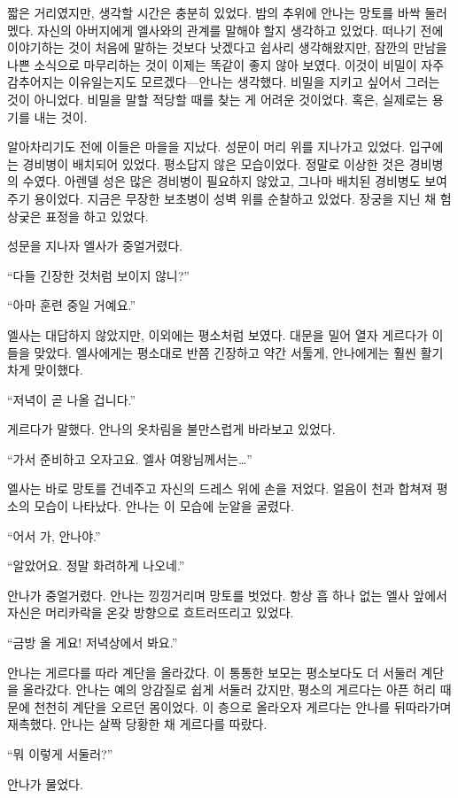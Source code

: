 짧은 거리였지만, 생각할 시간은 충분히 있었다. 밤의 추위에 안나는 망토를 바싹 둘러멨다. 자신의 아버지에게 엘사와의 관계를 말해야 할지 생각하고 있었다. 떠나기 전에 이야기하는 것이 처음에 말하는 것보다 낫겠다고 쉽사리 생각해왔지만, 잠깐의 만남을 나쁜 소식으로 마무리하는 것이 이제는 똑같이 좋지 않아 보였다. 이것이 비밀이 자주 감추어지는 이유일는지도 모르겠다—안나는 생각했다. 비밀을 지키고 싶어서 그러는 것이 아니었다. 비밀을 말할 적당할 때를 찾는 게 어려운 것이었다. 혹은, 실제로는 용기를 내는 것이.

알아차리기도 전에 이들은 마을을 지났다. 성문이 머리 위를 지나가고 있었다. 입구에는 경비병이 배치되어 있었다. 평소답지 않은 모습이었다. 정말로 이상한 것은 경비병의 수였다. 아렌델 성은 많은 경비병이 필요하지 않았고, 그나마 배치된 경비병도 보여주기 용이었다. 지금은 무장한 보초병이 성벽 위를 순찰하고 있었다. 장궁을 지닌 채 험상궂은 표정을 하고 있었다.

성문을 지나자 엘사가 중얼거렸다.

``다들 긴장한 것처럼 보이지 않니?''

``아마 훈련 중일 거예요.''

엘사는 대답하지 않았지만, 이외에는 평소처럼 보였다. 대문을 밀어 열자 게르다가 이들을 맞았다. 엘사에게는 평소대로 반쯤 긴장하고 약간 서툴게, 안나에게는 훨씬 활기차게 맞이했다.

``저녁이 곧 나올 겁니다.''

게르다가 말했다. 안나의 옷차림을 불만스럽게 바라보고 있었다.

``가서 준비하고 오자고요. 엘사 여왕님께서는\ldots''

엘사는 바로 망토를 건네주고 자신의 드레스 위에 손을 저었다. 얼음이 천과 합쳐져 평소의 모습이 나타났다. 안나는 이 모습에 눈알을 굴렸다.

``어서 가, 안나야.''

``알았어요. 정말 화려하게 나오네.''

안나가 중얼거렸다. 안나는 낑낑거리며 망토를 벗었다. 항상 흠 하나 없는 엘사 앞에서 자신은 머리카락을 온갖 방향으로 흐트러뜨리고 있었다.

``금방 올 게요! 저녁상에서 봐요.''

안나는 게르다를 따라 계단을 올라갔다. 이 통통한 보모는 평소보다도 더 서둘러 계단을 올라갔다. 안나는 예의 앙감질로 쉽게 서둘러 갔지만, 평소의 게르다는 아픈 허리 때문에 천천히 계단을 오르던 몸이었다. 이 층으로 올라오자 게르다는 안나를 뒤따라가며 재촉했다. 안나는 살짝 당황한 채 게르다를 따랐다.

``뭐 이렇게 서둘러?''

안나가 물었다.

